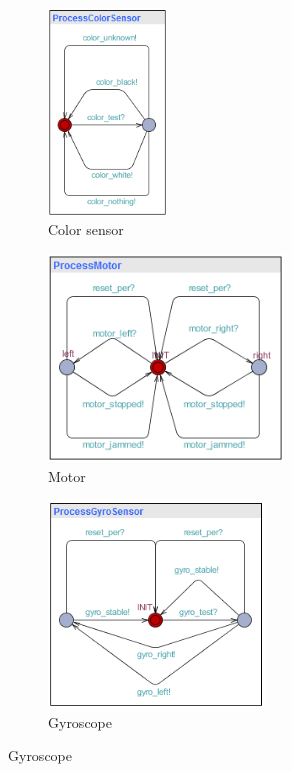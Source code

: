 \documentclass[a4paper,oneside,11pt]{article}
\begin{document}
\begin{figure}
\centering
\begin{subfigure}{0.1\textwidth}
\centering
\includegraphics[height=55mm]{processcolorsensor}
\caption{Color sensor}
\end{subfigure}
\hfill
\begin{subfigure}{0.3\textwidth}
\centering
\includegraphics[height=55mm]{processmotor}
\caption{Motor}
\end{subfigure}
\hfill
\begin{subfigure}{0.3\textwidth}
\centering
\includegraphics[height=55mm]{processgyrosensor}
\caption{Gyroscope}
\end{subfigure}


\end{figure}
\end{document}
